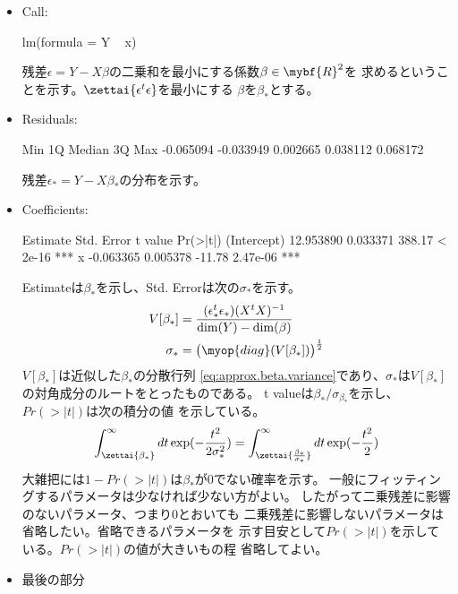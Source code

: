 	\begin{itemize}\setlength{\itemsep}{-1mm} %
		\item Call:
		\begin{cprog}
			lm(formula = Y ~ x)
		\end{cprog}
		残差$\epsilon=Y-X\beta$の二乗和を最小にする係数$\beta\in\mybf{R}^2$を
		求めるということを示す。$\zettai{\epsilon^t\epsilon}$を最小にする
		$\beta$を$\beta_*$とする。
		\item Residuals:
		\begin{cprog}
						Min        1Q    Median        3Q       Max 
			-0.065094 -0.033949  0.002665  0.038112  0.068172
		\end{cprog}
		残差$\epsilon_*=Y-X\beta_*$の分布を示す。
		\item Coefficients:
		\begin{cprog}
									 Estimate Std. Error t value Pr(>|t|)    
			(Intercept) 12.953890   0.033371  388.17  < 2e-16 ***
			x           -0.063365   0.005378  -11.78 2.47e-06 ***
		\end{cprog}
		Estimateは$\beta_*$を示し、Std. Errorは次の$\sigma_*$を示す。
		\begin{equation*}\begin{split} %
			V[\beta_*]
			&= \frac{(\epsilon_*^t\epsilon_*)(X^tX)^{-1}}{\dim(Y)-\dim(\beta)} \\
			\sigma_* &= \bigl(\myop{diag}(V[\beta_*])\bigr)^{\frac{1}{2}} \\
		\end{split}\end{equation*} %
		$V[\beta_*]$は近似した$\beta_*$の分散行列
		\eqref{eq:approx.beta.variance}であり、$\sigma_*$は$V[\beta_*]$
		の対角成分のルートをとったものである。
		t valueは$\beta_*/\sigma_{\beta_*}$を示し、$Pr(>|t|)$は次の積分の値
		を示している。
		\begin{equation*}\begin{split} %
			\int_{\zettai{\beta_*}}^\infty dt \exp(-\frac{t^2}{2\sigma_*^2})
			= \int_{\zettai{\frac{\beta_*}{\sigma_*}}}^\infty
				dt \exp(-\frac{t^2}{2})
		\end{split}\end{equation*} %
		大雑把には$1-Pr(>|t|)$は$\beta_*$が$0$でない確率を示す。
		一般にフィッティングするパラメータは少なければ少ない方がよい。
		したがって二乗残差に影響のないパラメータ、つまり$0$とおいても
		二乗残差に影響しないパラメータは省略したい。省略できるパラメータを
		示す目安として$Pr(>|t|)$を示している。$Pr(>|t|)$の値が大きいもの程
		省略してよい。
		\item 最後の部分

\end{itemize}
